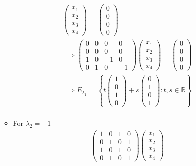 \begin{enumerate}
\begin{itemize}
\begin{gather}
\begin{pmatrix}
x_1\\x_2\\x_3\\x_4
\end{pmatrix}
=
\begin{pmatrix}
0\\0\\0\\0
\end{pmatrix}\\
\implies
\begin{pmatrix}
0 & 0 & 0 & 0\\
0 & 0 & 0 & 0\\
1 & 0 & -1 & 0\\
0 & 1 & 0 & -1
\end{pmatrix}
\begin{pmatrix}
x_1\\x_2\\x_3\\x_4
\end{pmatrix}
=
\begin{pmatrix}
0\\0\\0\\0
\end{pmatrix}\\
\implies E_{\lambda_1} = \left\{
t\begin{pmatrix}1\\0\\1\\0\end{pmatrix} +
s \begin{pmatrix}0\\1\\0\\1\end{pmatrix} \colon t,s \in \mathbb{R}
\right\}\\
\end{gather}
\item For $\lambda_2 = -1$
\begin{gather}
\begin{pmatrix}
1 & 0 & 1 & 0\\
0 & 1 & 0 & 1\\
1 & 0 & 1 & 0\\
0 & 1 & 0 & 1
\end{pmatrix}
\begin{pmatrix}
x_1\\x_2\\x_3\\x_4
\end{pmatrix}

\end{gather}
\end{itemize}
\end{enumerate}

